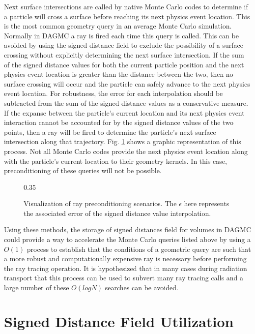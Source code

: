 Next surface intersections are called by native Monte Carlo codes to determine
if a particle will cross a surface before reaching its next physics event
location. This is the most common geometry query in an average Monte Carlo
simulation. Normally in DAGMC a ray is fired each time this query is
called. This can be avoided by using the signed distance field to exclude the
possibility of a surface crossing without explicitly determining the next
surface intersection. If the sum of the signed distance values for both the
current particle position and the next physics event location is greater than
the distance between the two, then no surface crossing will occur and the
particle can safely advance to the next physics event location. For robustness,
the error for each interpolation should be subtracted from the sum of the signed
distance values as a conservative measure. If the expanse between the particle's
current location and its next physics event interaction cannot be accounted for
by the signed distance values of the two points, then a ray will be fired to
determine the particle's next surface intersection along that
trajectory. Fig. \ref{fig:precondition_ray} shows a graphic representation of
this process. Not all Monte Carlo codes provide the next physics event location
along with the particle's current location to their geometry kernels. In this
case, preconditioning of these queries will not be possible.

\begin{figure}[ht]
  \center
  {0.35\textwidth}
  \caption{Visualization of ray preconditioning scenarios. The $\epsilon$ here represents
    the associated error of the signed distance value interpolation.}
  \label{fig:precondition_ray}
\end{figure}

Using these methods, the storage of signed distances field for volumes in DAGMC
could provide a way to accelerate the Monte Carlo queries listed above by using
a $O(1)$ process to establish that the conditions of a geometric query are such
that a more robust and computationally expensive ray is necessary before
performing the ray tracing operation. It is hypothesized that in many cases
during radiation transport that this process can be used to subvert many ray
tracing calls and a large number of these $O(logN)$ searches can be avoided.
\section{Signed Distance Field Utilization}\label{section:preconditioner_utilization}

